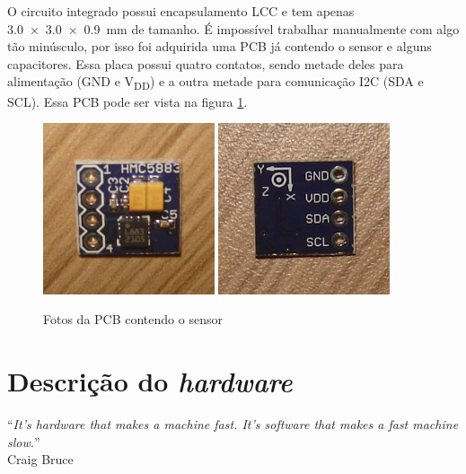 \documentclass[brazil,pagestart=firstchapter]{abnt}
\newcommand*{\VDD}{V\textsubscript{DD}\xspace}
\newcommand*{\GND}{GND\xspace}
\begin{document}
O circuito integrado possui encapsulamento \ac{LCC} e tem apenas
\SI[product-units=single]{3.0 x 3.0 x 0.9}{\milli\metre} de tamanho. É
impossível trabalhar manualmente com algo tão minúsculo, por isso foi
adquirida uma \ac{PCB} já contendo o sensor e alguns capacitores.
\cite{ebay_HMC5883L} Essa placa possui quatro contatos, sendo metade deles
para alimentação (\GND e \VDD) e a outra metade para comunicação \ac{I2C}
(SDA e SCL). Essa \ac{PCB} pode ser vista na figura \ref{fig:sensor_photos}.

\begin{figure}[h]
\centering
\includegraphics[width=0.45\textwidth]{img/sensor_front.jpg}
\includegraphics[width=0.45\textwidth]{img/sensor_back.jpg}
\caption{Fotos da PCB contendo o sensor}
\label{fig:sensor_photos}
\end{figure}


\chapter{Descrição do \textit{hardware}}
\label{cap:hardware}


\vfill{}
\begin{flushright}{}
``\emph{It's hardware that makes a machine fast. It's software that makes a
fast machine slow.}''\\
{\small Craig Bruce}
\end{flushright}{\small \par}
\vfill{}
\end{document}
